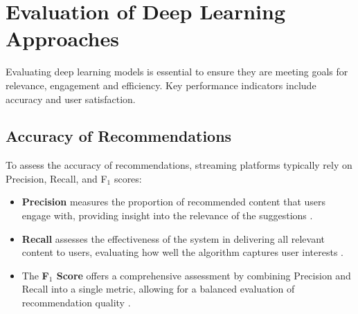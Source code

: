 \documentclass[12pt, english, a4paper]{article}
\begin{document}
\section{Evaluation of Deep Learning Approaches}

\hspace*{2em}Evaluating deep learning models is essential to ensure they are meeting goals for relevance, engagement and efficiency. Key performance indicators include accuracy and user satisfaction.

\subsection{Accuracy of Recommendations}

\hspace*{2em}To assess the accuracy of recommendations, streaming platforms typically rely on Precision, Recall, and F$_{1}$ scores:

\begin{itemize}
    \item \textbf{Precision} measures the proportion of recommended content that users engage with, providing insight into the relevance of the suggestions \cite{Fayyaz20201}.
    
    \item \textbf{Recall} assesses the effectiveness of the system in delivering all relevant content to users, evaluating how well the algorithm captures user interests \cite{Fayyaz20201}.
    
    \item The \textbf{F$_{1}$ Score} offers a comprehensive assessment by combining Precision and Recall into a single metric, allowing for a balanced evaluation of recommendation quality \cite{Fayyaz20201}.
\end{itemize}

\begin{table} %
\vspace{-1.5em} %
\centering
\renewcommand{\arraystretch}{3} %
\setlength{\tabcolsep}{20pt} %
\caption{Formulas of Precision, Recall and F$_{1}$ Score}
\label{tab:formulas}
\end{table}
\end{document}
